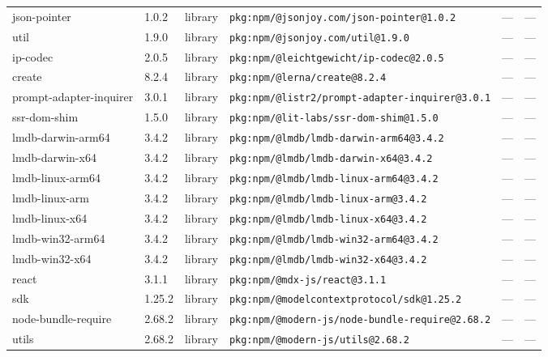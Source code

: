 \documentclass[11pt,a4paper]{article}
\begin{document}
\begin{longtable}{|p{4cm}|p{2cm}|p{1.6cm}|p{5cm}|p{1.5cm}|p{3.5cm}|}
\raggedright json-pointer & 1.0.2 & library & \small\texttt{pkg:npm/@jsonjoy.com/json-pointer@1.0.2} & — & \small — \\
\raggedright util & 1.9.0 & library & \small\texttt{pkg:npm/@jsonjoy.com/util@1.9.0} & — & \small — \\
\raggedright ip-codec & 2.0.5 & library & \small\texttt{pkg:npm/@leichtgewicht/ip-codec@2.0.5} & — & \small — \\
\raggedright create & 8.2.4 & library & \small\texttt{pkg:npm/@lerna/create@8.2.4} & — & \small — \\
\raggedright prompt-adapter-inquirer & 3.0.1 & library & \small\texttt{pkg:npm/@listr2/prompt-adapter-inquirer@3.0.1} & — & \small — \\
\raggedright ssr-dom-shim & 1.5.0 & library & \small\texttt{pkg:npm/@lit-labs/ssr-dom-shim@1.5.0} & — & \small — \\
\raggedright lmdb-darwin-arm64 & 3.4.2 & library & \small\texttt{pkg:npm/@lmdb/lmdb-darwin-arm64@3.4.2} & — & \small — \\
\raggedright lmdb-darwin-x64 & 3.4.2 & library & \small\texttt{pkg:npm/@lmdb/lmdb-darwin-x64@3.4.2} & — & \small — \\
\raggedright lmdb-linux-arm64 & 3.4.2 & library & \small\texttt{pkg:npm/@lmdb/lmdb-linux-arm64@3.4.2} & — & \small — \\
\raggedright lmdb-linux-arm & 3.4.2 & library & \small\texttt{pkg:npm/@lmdb/lmdb-linux-arm@3.4.2} & — & \small — \\
\raggedright lmdb-linux-x64 & 3.4.2 & library & \small\texttt{pkg:npm/@lmdb/lmdb-linux-x64@3.4.2} & — & \small — \\
\raggedright lmdb-win32-arm64 & 3.4.2 & library & \small\texttt{pkg:npm/@lmdb/lmdb-win32-arm64@3.4.2} & — & \small — \\
\raggedright lmdb-win32-x64 & 3.4.2 & library & \small\texttt{pkg:npm/@lmdb/lmdb-win32-x64@3.4.2} & — & \small — \\
\raggedright react & 3.1.1 & library & \small\texttt{pkg:npm/@mdx-js/react@3.1.1} & — & \small — \\
\raggedright sdk & 1.25.2 & library & \small\texttt{pkg:npm/@modelcontextprotocol/sdk@1.25.2} & — & \small — \\
\raggedright node-bundle-require & 2.68.2 & library & \small\texttt{pkg:npm/@modern-js/node-bundle-require@2.68.2} & — & \small — \\
\raggedright utils & 2.68.2 & library & \small\texttt{pkg:npm/@modern-js/utils@2.68.2} & — & \small — \\

\end{longtable}
\end{document}
